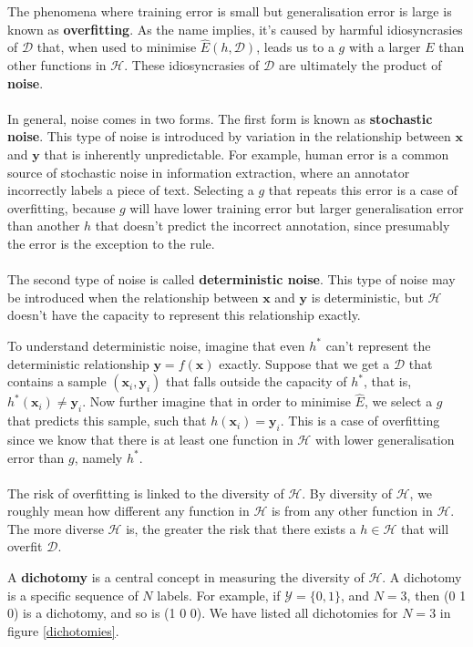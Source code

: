 The phenomena where training error is small but generalisation error is large is known as \textbf{overfitting}. As the name implies, it's caused by harmful idiosyncrasies of $\mathcal{D}$ that, when used to minimise $\hat{E}(h, \mathcal{D})$, leads us to a $g$ with a larger $E$ than other functions in $\mathcal{H}$. These idiosyncrasies of $\mathcal{D}$ are ultimately the product of \textbf{noise}.
\\\\
In general, noise comes in two forms. The first form is known as \textbf{stochastic noise}. This type of noise is introduced by variation in the relationship between $\mathbf{x}$ and $\mathbf{y}$ that is inherently unpredictable. For example, human error is a common source of stochastic noise in information extraction, where an annotator incorrectly labels a piece of text. Selecting a $g$ that repeats this error is a case of overfitting, because $g$ will have lower training error but larger generalisation error than another $h$ that doesn't predict the incorrect annotation, since presumably the error is the exception to the rule.
\\\\
The second type of noise is called \textbf{deterministic noise}. This type of noise may be introduced when the relationship between $\mathbf{x}$ and $\mathbf{y}$ is deterministic, but $\mathcal{H}$ doesn't have the capacity to represent this relationship exactly.

To understand deterministic noise, imagine that even $h^*$ can't represent the deterministic relationship $\mathbf{y} = f(\mathbf{x})$ exactly. Suppose that we get a $\mathcal{D}$ that contains a sample $(\mathbf{x}_i, \mathbf{y}_i)$ that falls outside the capacity of $h^*$, that is, $h^*(\mathbf{x}_i) \neq \mathbf{y}_i$. Now further imagine that in order to minimise $\hat{E}$, we select a $g$ that predicts this sample, such that $h(\mathbf{x}_i) = \mathbf{y}_i$. This is a case of overfitting since we know that there is at least one function in $\mathcal{H}$ with lower generalisation error than $g$, namely $h^*$.
\\\\
The risk of overfitting is linked to the diversity of $\mathcal{H}$. By diversity of $\mathcal{H}$, we roughly mean how different any function in $\mathcal{H}$ is from any other function in $\mathcal{H}$. The more diverse $\mathcal{H}$ is, the greater the risk that there exists a $h \in \mathcal{H}$ that will overfit $\mathcal{D}$.

A \textbf{dichotomy} is a central concept in measuring the diversity of $\mathcal{H}$. A dichotomy is a specific sequence of $N$ labels. For example, if $\mathcal{Y} = \{0, 1\}$, and $N = 3$, then (0 1 0) is a dichotomy, and so is (1 0 0). We have listed all dichotomies for $N = 3$ in figure \ref{dichotomies}.

